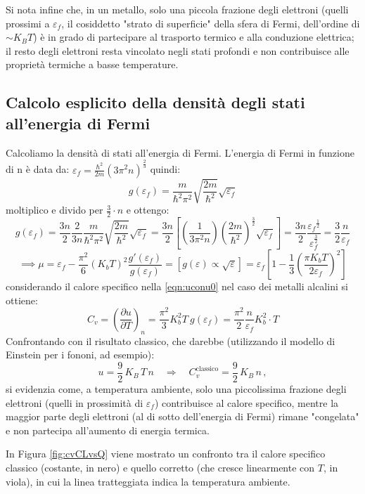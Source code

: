 \bigskip
\noindent
Si nota infine che, in un metallo, solo una piccola frazione degli elettroni (quelli prossimi a $\varepsilon_f$, il cosiddetto "strato di superficie" della sfera di Fermi, dell'ordine di $\sim K_B T$) è in grado di partecipare al trasporto termico e alla conduzione elettrica; il resto degli elettroni resta vincolato negli stati profondi e non contribuisce alle proprietà termiche a basse temperature.

\bigskip
\subsection{Calcolo esplicito della densità degli stati all'energia di Fermi}
Calcoliamo la densità di stati all'energia di Fermi. L'energia di Fermi in funzione di n è data da: $\varepsilon_f = \frac{\hbar^2}{2m}(3\pi^2 n)^{\frac{2}{3}}$ quindi:
\[ g(\varepsilon_f) = \frac{m}{\hbar^2 \pi^2} \sqrt{\frac{2m}{\hbar^2}} \sqrt{\varepsilon_f} \]
moltiplico e divido per $\frac{3}{2}\cdot n$ e ottengo:
\[ g(\varepsilon_f) =  \frac{3n}{2} \frac{2}{3n} \frac{m}{\hbar^2 \pi^2} \sqrt{\frac{2m}{\hbar^2}} \sqrt{\varepsilon_f} =  \frac{3n}{2} \left[ \left( \frac{1}{3\pi^2 n} \right) \left( \frac{2m}{\hbar^2} \right)^{\frac{3}{2}} \sqrt{\varepsilon_f} \right] = \frac{3n}{2} \frac{{\varepsilon_f}^\frac{1}{2}}{\varepsilon_f^{\frac{3}{2}}} = \frac{3}{2} \frac{n}{\varepsilon_f} \]
\[ \implies \mu =  \varepsilon_f - \frac{\pi^2}{6} (K_b T)^2 \frac{g'(\varepsilon_f) }{g(\varepsilon_f) }= [g(\varepsilon) \propto \sqrt{\varepsilon}] = \varepsilon_f \left[ 1 - \frac{1}{3} \left( \frac{\pi K_b T}{2 \varepsilon_f} \right)^2 \right] \]
considerando il calore specifico nella \ref{eqn:uconu0} nel caso dei metalli alcalini si ottiene:
\[ C_v = \left( \frac{\partial u}{\partial T} \right)_n = \frac{\pi^2}{3} K_b^2 T \ g(\varepsilon_f) = \frac{\pi^2}{2}\frac{n}{\varepsilon_f}K_b^2\cdot T\]
Confrontando con il risultato classico, che darebbe (utilizzando il modello di Einstein per i fononi, ad esempio):
\[
u= \frac{9}{2}\, K_B\, T\, n \quad \Longrightarrow \quad C_v^{\text{classico}}= \frac{9}{2}\,K_B\, n\,,
\]
si evidenzia come, a temperatura ambiente, solo una piccolissima frazione degli elettroni (quelli in prossimità di $\varepsilon_f$) contribuisce al calore specifico, mentre la maggior parte degli elettroni (al di sotto dell'energia di Fermi) rimane "congelata" e non partecipa all'aumento di energia termica.

\bigskip
\noindent
In Figura \ref{fig:cvCLvsQ} viene mostrato un confronto tra il calore specifico classico (costante, in nero) e quello corretto (che cresce linearmente con $T$, in viola), in cui la linea tratteggiata indica la temperatura ambiente.

